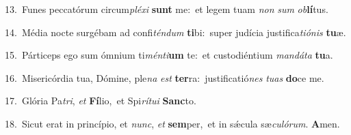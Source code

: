 {\numbfont\textcolor{\numbcolor}{13.}}~Funes peccatórum circum\-\textit{plé}\-\textit{xi} \textbf{sunt} me:~\star et legem tuam \textit{non} \textit{sum} \textit{ob}\-\textbf{lí}tus.\par
{\numbfont\textcolor{\numbcolor}{14.}}~Média nocte surgébam ad confi\-\textit{tén}\-\textit{dum} \textbf{ti}\-bi:~\star super judícia justifica\-\textit{ti}\-\textit{ó}\textit{nis} \textbf{tu}\-æ.\par
{\numbfont\textcolor{\numbcolor}{15.}}~Párticeps ego sum ómnium ti\-\textit{mén}\-\textit{ti}\textbf{um} te:~\star et custodiéntium \textit{man}\-\textit{dá}\textit{ta} \textbf{tu}\-a.\par
{\numbfont\textcolor{\numbcolor}{16.}}~Misericórdia tua, Dómine, ple\textit{na} \textit{est} \textbf{ter}\-ra:~\star justificatió\textit{nes} \textit{tu}\-\textit{as} \textbf{do}\-ce me.\par
{\numbfont\textcolor{\numbcolor}{17.}}~Glória Pa\-\textit{tri}\-, \textit{et} \textbf{Fí}\-lio,~\star et Spi\-\textit{rí}\-\textit{tu}\textit{i} \textbf{Sanc}\-to.\par
{\numbfont\textcolor{\numbcolor}{18.}}~Sicut erat in princípio, et \textit{nunc}\-, \textit{et} \textbf{sem}\-per,~\star et in sǽcula sæ\-\textit{cu}\-\textit{ló}\textit{rum}. \textbf{A}\-men.\par
